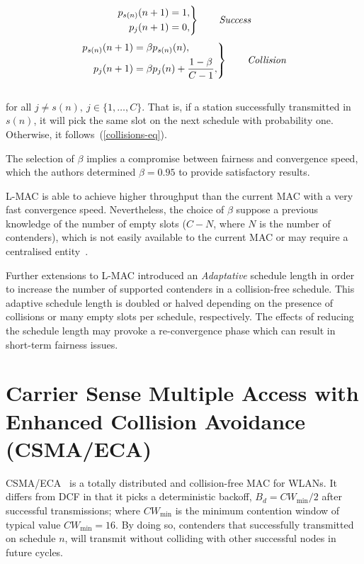 \documentclass[a4paper,journal]{IEEEtran}
\begin{document}
\begin{equation} \label{success}
		\left. \begin{aligned}
			p_{s(n)}(n+1)&=1,\\
			p_{j}(n+1)&=0,
		\end{aligned}
	\right\}
	\qquad \text{\emph{Success}}
\end{equation}
\begin{equation} \label{collisions-eq}
	\left. \begin{aligned}
			p_{s(n)}(n+1)&=\beta p_{s(n)}(n),\\
			p_{j}(n+1)&=\beta p_{j}(n)+\frac{1-\beta}{C -1},
		\end{aligned}
	\right\}
	\qquad \text{\emph{Collision}}
\end{equation}
\\
for all $j\neq s(n),~j\in \{1,\dots ,C\}$. That is, if a station successfully transmitted in $s(n)$, it will pick the same slot on the next schedule with probability one. Otherwise, it follows~(\ref{collisions-eq}).

The selection of $\beta$ implies a compromise between fairness and convergence speed, which the authors determined $\beta=0.95$ to provide satisfactory results.

L-MAC is able to achieve higher throughput than the current MAC with a very fast convergence speed. Nevertheless, the choice of $\beta$ suppose a previous knowledge of the number of empty slots ($C-N$, where $N$ is the number of contenders), which is not easily available to the current MAC or may require a centralised entity~\cite{barcelo2011tcf}.

Further extensions to L-MAC introduced an \emph{Adaptative} schedule length in order to increase the number of supported contenders in a collision-free schedule. This adaptive schedule length is doubled or halved depending on the presence of collisions or many empty slots per schedule, respectively. The effects of reducing the schedule length may provoke a re-convergence phase which can result in short-term fairness issues. 

\section{Carrier Sense Multiple Access with Enhanced Collision Avoidance (CSMA/ECA)}\label{introProtocol}
CSMA/ECA~\cite{barcelo2008lba} is a totally distributed and collision-free MAC for WLANs. It differs from DCF in that it picks a deterministic backoff, $B_{d}=CW_{\min}/2$ after successful transmissions; where $CW_{\min}$ is the minimum contention window of typical value $CW_{\min}=16$. By doing so, contenders that successfully transmitted on schedule $n$, will transmit without colliding with other successful nodes in future cycles.
\end{document}
